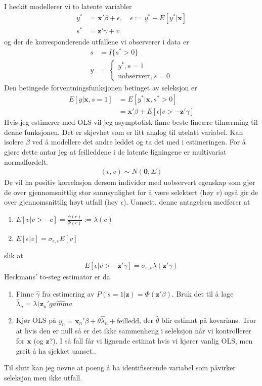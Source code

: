 I heckit modellerer vi to latente variabler
\begin{align}
y^*&= \mathbf{x}'\beta+\epsilon, \quad \epsilon := y^*-E[y^*|\mathbf{x}] \\
s^*&= \mathbf{z}'\gamma+v 
\end{align}
og der de korresponderende utfallene vi observerer i data er
\begin{align}
s &= I\{s^*>0\} \\
y &= 
\begin{cases}
y^*, s=1 \\
\text{uobservert}, s=0
\end{cases}
\end{align}
Den betingede forventningsfunksjonen betinget av seleksjon er 
\begin{align}
E[y|\mathbf{x}, s=1] &= E[y^*|\mathbf{x}, s^*>0] \\
&= \mathbf{x}'\beta + E[\epsilon|v >-\mathbf{z}'\gamma]
\end{align}
Hvis jeg estimerer med OLS vil jeg asymptotisk finne beste lineære tilnærming til denne funksjonen. Det er skjevhet som er litt analog til utelatt variabel. Kan isolere $\beta$ ved å modellere det andre leddet og ta det med i estimeringen. For å gjøre dette antar jeg at feilleddene i de latente ligningene er multivariat normalfordelt.
\begin{align}
(\epsilon, v) \sim N(\mathbf{0}, \Sigma)
\end{align}
De vil ha positiv korrelasjon dersom individer med uobservert egenskap som gjør de over gjennomsnittlig stor sannsynlighet for å være selektert (høy $v$) også gir de over gjennomsnittlig høyt utfall (høy $\epsilon$). Uansett, denne antagelsen medfører at 
\begin{enumerate}
\item $E[v|v>-c] = \frac{\phi(c)}{\Phi(c)} := \lambda(c)$
\item $E[\epsilon|v] = \sigma_{\epsilon, v} E[v]$
\end{enumerate}
slik at 
\begin{align}
E[\epsilon|v >-\mathbf{z}'\gamma] = \sigma_{\epsilon, v}\lambda(\mathbf{z}'\gamma)
\end{align}
Heckmans' to-steg estimator er da
\begin{enumerate}
\item Finne $\hat{\gamma}$ fra estimering av $P(s=1|\mathbf{z}) = \Phi(\mathbf{z}'\beta)$. Bruk det til å lage $\hat{\lambda}_n = \lambda(\mathbf{z}_n'\hat{gamma}$
\item Kjør OLS på $y_n=\mathbf{x}_n'\beta+\theta\hat{\lambda}_n +\text{feilledd}$, der $\hat{\theta}$ blir estimat på kovarians. Tror at hvis den er null så er det ikke sammenheng i seleksjon når vi kontrollerer for $\mathbf{x}$ (og $\mathbf{z}$?). I så fall får vi lignende estimat hvis vi kjører vanlig OLS, men greit å ha sjekket uanset..
\end{enumerate}
Til slutt kan jeg nevne at poeng å ha identifiserende variabel som påvirker seleksjon men ikke utfall.
